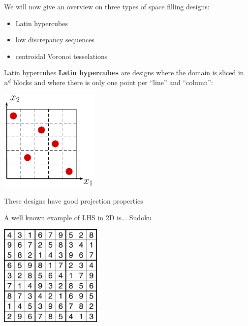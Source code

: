 \documentclass{beamer}
\begin{document}
\begin{frame}{}
We will now give an overview on three types of space filling designs:
\begin{itemize}
	\item Latin hypercubes
	\item low discrepancy sequences
	\item centroidal Voronoi tesselations
\end{itemize}
\end{frame}

\begin{frame}{Latin hypercubes}
\textbf{Latin hypercubes} are designs where the domain is sliced in $n^d$ blocks and where there is only one point per ``line'' and ``column'':
\begin{center}
\includegraphics[height=5cm]{figures/latexdraw/lhs1}
\end{center}
These designs have good projection properties
\end{frame}


\begin{frame}{}
A well known example of LHS in 2D is... Sudoku
\vspace{5mm}
\begin{center}
\includegraphics[height=5cm]{figures/sudoku}
\end{center}
\end{frame}
\end{document}

